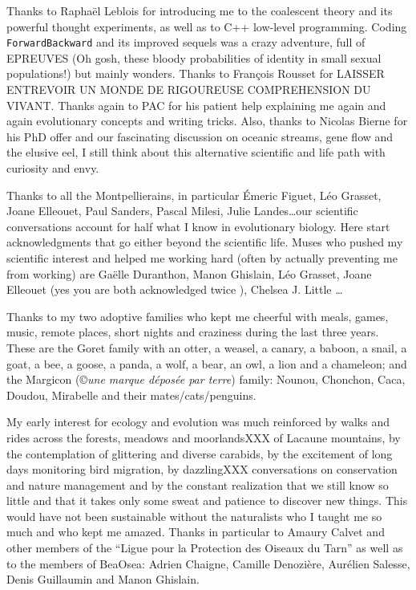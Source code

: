 Thanks to Rapha\"{e}l Leblois for introducing me to the coalescent theory and its powerful thought experiments, as well as to C++ low-level programming. Coding \texttt{ForwardBackward} and its improved sequels was a crazy adventure, full of EPREUVES (Oh gosh, these bloody probabilities of identity in small sexual populations!) but mainly wonders. Thanks to Fran\c{c}ois Rousset for LAISSER ENTREVOIR UN MONDE DE RIGOUREUSE COMPREHENSION DU VIVANT.
Thanks again to PAC for his patient help explaining me again and again evolutionary concepts and writing tricks.
Also, thanks to Nicolas Bierne for his PhD offer and our fascinating discussion on oceanic streams, gene flow and the elusive eel, I still think about this alternative scientific and life path with curiosity and envy. 

Thanks to all the Montpellierains, in particular \'{E}meric Figuet, L\'{e}o Grasset, Joane Elleouet, Paul Sanders, Pascal Milesi, Julie Landes\dots our scientific conversations account for half what I know in evolutionary biology.
Here start acknowledgments that go either beyond the scientific life.
Muses who pushed my scientific interest and helped me working hard (often by actually preventing me from working)
are Ga\"elle Duranthon, Manon Ghislain, L\'{e}o Grasset, Joane Elleouet (yes you are both acknowledged twice ), Chelsea J. Little \dots

Thanks to my two adoptive families who kept me cheerful with meals, games, music, remote places, short nights and craziness during the last three years. These are the Goret family with an otter, a weasel, a canary, a baboon, a snail, a goat, a bee, a goose, a panda, a wolf, a bear, an owl, a lion and a chameleon; and the Margicon (\copyright \textit{une marque d\'{e}pos\'{e}e par terre}) family: Nounou, Chonchon, Caca, Doudou, Mirabelle and their mates/cats/penguins.

My early interest for ecology and evolution was much reinforced by walks and rides across the forests, meadows and moorlandsXXX of Lacaune mountains, by the contemplation of glittering and diverse carabids, by the excitement of long days monitoring bird migration, by dazzlingXXX conversations on conservation and nature management and by the constant realization that we still know so little and that it takes only some sweat and patience to discover new things.
This would have not been sustainable without the naturalists who I taught me so much and who kept me amazed. Thanks in particular to Amaury Calvet and other members of the ``Ligue pour la Protection des Oiseaux du Tarn'' as well as to the members of BeaOsea: Adrien Chaigne, Camille Denozière, Aur\'{e}lien Salesse, Denis Guillaumin and Manon Ghislain.

